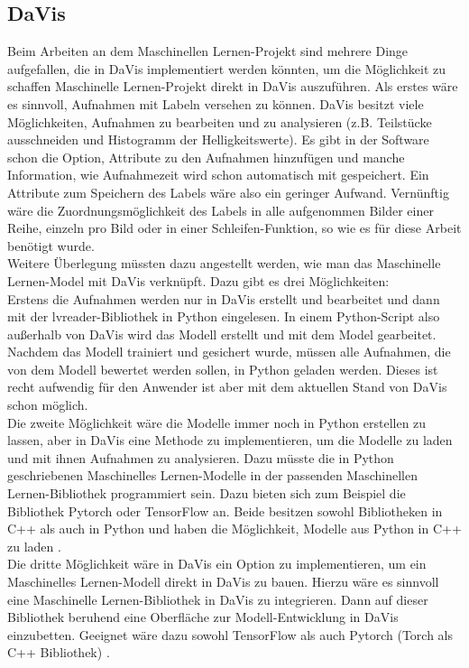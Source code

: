 \subsection{DaVis}
Beim Arbeiten an dem Maschinellen Lernen-Projekt sind mehrere Dinge aufgefallen,  die in DaVis implementiert werden könnten,  um die Möglichkeit zu schaffen Maschinelle Lernen-Projekt direkt in DaVis auszuführen.
Als erstes wäre es sinnvoll,  Aufnahmen mit Labeln versehen zu können. DaVis besitzt viele Möglichkeiten,  Aufnahmen zu bearbeiten und zu analysieren (z.B.  Teilstücke ausschneiden und Histogramm der Helligkeitswerte).
Es gibt in der Software schon die Option,  Attribute zu den Aufnahmen hinzufügen und manche Information, wie Aufnahmezeit wird schon automatisch mit gespeichert.  Ein Attribute zum Speichern des Labels wäre also ein geringer Aufwand.  Vernünftig wäre die Zuordnungsmöglichkeit des Labels in alle aufgenommen Bilder einer Reihe, einzeln pro Bild oder in einer Schleifen-Funktion, so wie es für diese Arbeit benötigt wurde.\\
Weitere Überlegung müssten dazu angestellt werden,  wie man das Maschinelle Lernen-Model mit DaVis verknüpft. Dazu gibt es drei Möglichkeiten:\\
Erstens die Aufnahmen werden nur in DaVis erstellt und bearbeitet und dann mit der lvreader-Bibliothek  in Python eingelesen. In einem Python-Script also außerhalb von DaVis wird das Modell erstellt und mit dem Model gearbeitet. Nachdem das Modell trainiert und gesichert wurde, müssen alle Aufnahmen, die von dem Modell bewertet werden sollen,  in Python geladen werden. Dieses ist recht aufwendig für den Anwender ist aber mit dem aktuellen Stand von DaVis schon möglich. \\
Die zweite Möglichkeit wäre die Modelle immer noch in Python erstellen zu lassen, aber in DaVis eine Methode zu implementieren, um die Modelle zu laden und mit ihnen Aufnahmen zu analysieren.  Dazu müsste die in Python geschriebenen Maschinelles Lernen-Modelle in der passenden Maschinellen Lernen-Bibliothek programmiert sein.  Dazu bieten sich zum Beispiel die Bibliothek  Pytorch \cite{pytorch} oder TensorFlow an. Beide besitzen sowohl Bibliotheken in C++ als auch in Python und haben die Möglichkeit,  Modelle aus Python in C++ zu laden \cite{pytorch} \cite{tensorflowC}. \\
Die dritte Möglichkeit wäre in DaVis ein Option zu implementieren, um ein Maschinelles Lernen-Modell direkt in DaVis zu bauen.  Hierzu wäre es sinnvoll eine Maschinelle Lernen-Bibliothek in DaVis zu integrieren.  Dann auf dieser Bibliothek beruhend eine Oberfläche zur Modell-Entwicklung in DaVis einzubetten.  Geeignet wäre dazu sowohl TensorFlow als auch Pytorch (Torch als C++ Bibliothek) \cite{Kolodiazhnyi2020}.